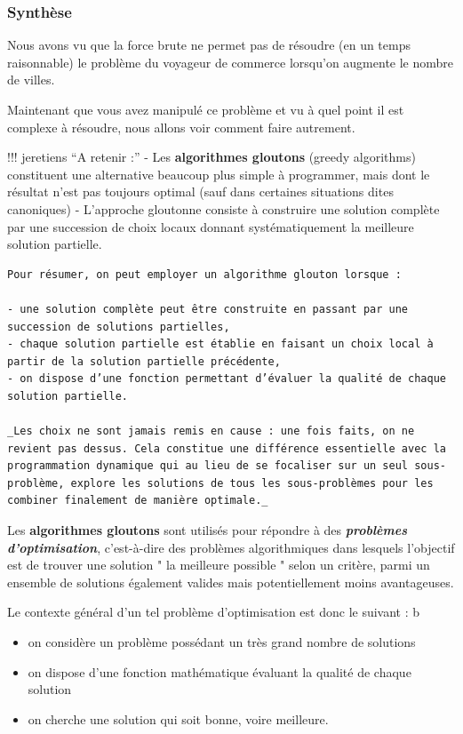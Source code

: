 \hypertarget{synthuxe8se}{%
\subsubsection{Synthèse}\label{synthuxe8se}}

Nous avons vu que la force brute ne permet pas de résoudre (en un temps
raisonnable) le problème du voyageur de commerce lorsqu'on augmente le
nombre de villes.

Maintenant que vous avez manipulé ce problème et vu à quel point il est
complexe à résoudre, nous allons voir comment faire autrement.

!!! jeretiens ``A retenir :'' - Les \textbf{algorithmes gloutons}
(greedy algorithms) constituent une alternative beaucoup plus simple à
programmer, mais dont le résultat n'est pas toujours optimal (sauf dans
certaines situations dites canoniques) - L'approche gloutonne consiste à
construire une solution complète par une succession de choix locaux
donnant systématiquement la meilleure solution partielle.

\begin{verbatim}
Pour résumer, on peut employer un algorithme glouton lorsque :  

- une solution complète peut être construite en passant par une succession de solutions partielles,  
- chaque solution partielle est établie en faisant un choix local à partir de la solution partielle précédente,  
- on dispose d’une fonction permettant d’évaluer la qualité de chaque solution partielle.  

_Les choix ne sont jamais remis en cause : une fois faits, on ne revient pas dessus. Cela constitue une différence essentielle avec la programmation dynamique qui au lieu de se focaliser sur un seul sous-problème, explore les solutions de tous les sous-problèmes pour les combiner finalement de manière optimale._
\end{verbatim}

Les \textbf{algorithmes gloutons} sont utilisés pour répondre à des
\textbf{\emph{problèmes d'optimisation}}, c'est-à-dire des problèmes
algorithmiques dans lesquels l'objectif est de trouver une solution " la
meilleure possible " selon un critère, parmi un ensemble de solutions
également valides mais potentiellement moins avantageuses.

Le contexte général d'un tel problème d'optimisation est donc le suivant
: b

\begin{itemize}
\tightlist
\item
  on considère un problème possédant un très grand nombre de solutions\\
\item
  on dispose d'une fonction mathématique évaluant la qualité de chaque
  solution\\
\item
  on cherche une solution qui soit bonne, voire meilleure.
\end{itemize}

